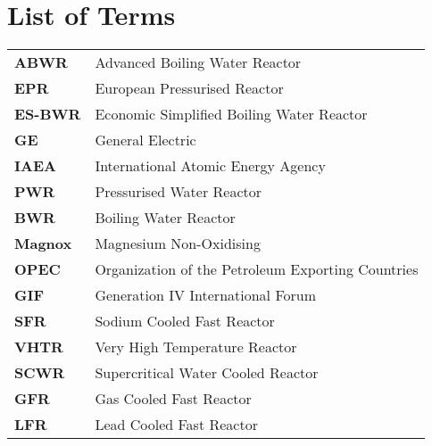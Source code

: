 \documentclass[journal]{IEEEtran}
\begin{document}
\section{List of Terms}
\begin{table}[!ht]
\label{table:Acronyms}
\centering
\begin{tabular}{l l}
\textbf{ABWR}& Advanced Boiling Water Reactor \\

\textbf{EPR} &European Pressurised Reactor\\

\textbf{ES-BWR}& Economic Simplified Boiling Water Reactor\\

\textbf{GE}& General Electric\\

\textbf{IAEA}& International Atomic Energy Agency\\

\textbf{PWR}& Pressurised Water Reactor\\

\textbf{BWR}& Boiling Water Reactor\\

\textbf{Magnox}& Magnesium Non-Oxidising\\

\textbf{OPEC} &Organization of the Petroleum Exporting Countries\\

\textbf{GIF}& Generation IV International Forum\\

\textbf{SFR}& Sodium Cooled Fast Reactor \\

\textbf{VHTR} &Very High Temperature Reactor \\

\textbf{SCWR}& Supercritical Water Cooled Reactor \\

\textbf{GFR}& Gas Cooled Fast Reactor \\

\textbf{LFR}& Lead Cooled Fast Reactor\\ 


\end{tabular}
\end{table}
\end{document}
